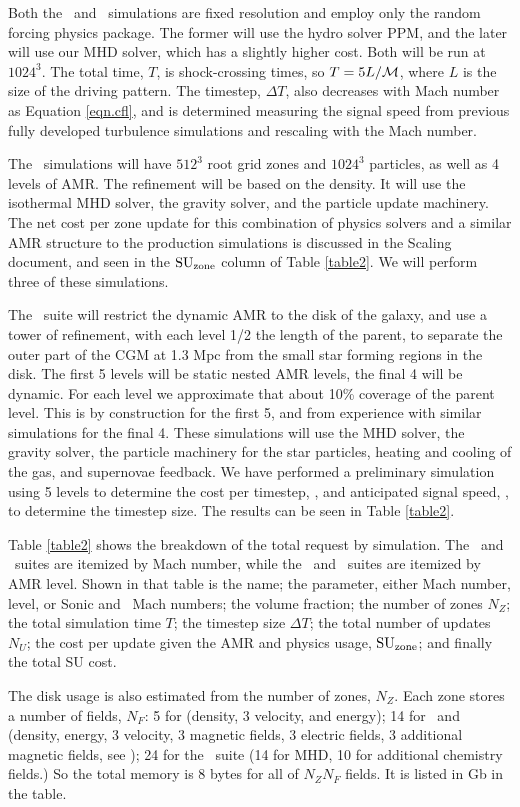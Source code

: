 Both the \nameTurbulence\ and \nameCMB\ simulations are fixed resolution and
employ only the random forcing physics package.  The former will use the hydro solver
PPM, and the later will use our MHD solver, which has a slightly higher cost.  Both will be
run at $1024^3$.  The total time, $T$, is  shock-crossing times, so $T =
5 L/\mathcal{M}$, where $L$ is the size of the driving pattern.  The
timestep, $\Delta T$, also decreases with Mach number as Equation \ref{eqn.cfl},
and is determined measuring the signal speed \vsignal from
previous fully developed turbulence simulations and rescaling with the Mach
number.

The \nameCores\ simulations will have $512^3$ root grid zones and $1024^3$
particles, as well as 4 levels of AMR.  The refinement will be based on the
density.  It will use the isothermal MHD solver, the gravity solver, and the
particle update machinery.  The net cost per zone update for this combination of
physics solvers and a similar AMR structure to the production simulations is
discussed in the Scaling document, and seen in the $\rm{SU}_{\rm{zone}}$ column of Table
\ref{table2}.  We will perform three of these simulations.

The \nameGalaxies\ suite will restrict the dynamic AMR to the disk of the galaxy, and
use a tower of refinement, with each level 1/2 the length of the parent, to separate the outer
part of the CGM at 1.3 Mpc from the small star forming regions in the disk.  The
first 5 levels will be static nested AMR levels, the final 4 will be dynamic.
For each level we approximate that about 10\% coverage of the parent level.
This is by construction for the first 5, and from experience with similar
simulations for the final 4.  These simulations will use the MHD solver, the
gravity solver, the particle machinery for the star particles, heating and
cooling of the gas, and supernovae feedback.  We have performed a preliminary
simulation using 5 levels to determine the cost per timestep, \suzu, and
anticipated signal speed, \vsignal, to determine the timestep size. The results
can be seen in Table \ref{table2}. 

Table \ref{table2} shows the breakdown of the total request by simulation.  The
\nameTurbulence\ and \nameCMB\ suites are itemized by Mach number, while the
\nameCores\ and \nameGalaxies\ suites are itemized by AMR level.  Shown in that
table is the name; the parameter, either Mach number, level, or Sonic and \alf\
Mach numbers;  the volume fraction; the number of zones $N_Z$; the total
simulation time $T$; the timestep size $\Delta T$; the total number of
updates $N_U$; the cost per update given the AMR and physics usage, $\rm{SU}_{\rm{zone}}$; and
finally the total SU cost.  

The disk usage is also estimated from the number of zones, $N_Z$.  Each zone
stores a number of fields, $N_F$: 5 for \nameTurbulence (density, 3 velocity, and
energy); 14 for \nameCores\ and
\nameCMB (density, energy, 3 velocity, 3 magnetic fields, 3 electric fields, 3
additional magnetic fields, see \citet{Collins10}); 24 for the \nameGalaxies\
suite (14 for MHD, 10 for additional chemistry fields.)  So the total memory is
8 bytes for all of $N_Z N_F$ fields.  It is listed in Gb in the table.


